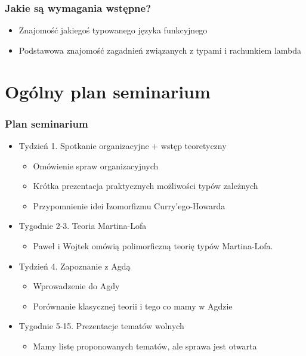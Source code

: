 \documentclass{beamer}
\begin{document}
\begin{frame}

\frametitle{Jakie są wymagania wstępne?}

\begin{itemize}
\item Znajomość jakiegoś typowanego języka funkcyjnego
\item Podstawowa znajomość zagadnień związanych z typami i rachunkiem lambda
\end{itemize}

\end{frame}


\section{Ogólny plan seminarium}

\begin{frame}

\frametitle{Plan seminarium}

\begin{itemize}

\item Tydzień 1. Spotkanie organizacyjne + wstęp teoretyczny

\begin{itemize}
\item <2-4> Omówienie spraw organizacyjnych
\item <3-4> Krótka prezentacja praktycznych możliwości typów zależnych
\item <4-4> Przypomnienie idei Izomorfizmu Curry'ego-Howarda
\end{itemize}

\item Tygodnie 2-3. Teoria Martina-Lofa

\begin{itemize}
\item <5-5> Paweł i Wojtek omówią polimorficzną teorię typów Martina-Lofa.
\end{itemize}

\item Tydzień 4. Zapoznanie z Agdą

\begin{itemize}
\item <6-7> Wprowadzenie do Agdy
\item <7-7> Porównanie klasycznej teorii i tego co mamy w Agdzie
\end{itemize}

\item Tygodnie 5-15. Prezentacje tematów wolnych
\begin{itemize}
\item <8-> Mamy listę proponowanych tematów, ale sprawa jest otwarta
\end{itemize}

\end{itemize}

\end{frame}
\end{document}

